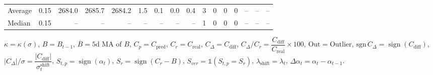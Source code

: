 \begin{threeparttable}
{\begin{tabular}{lrrrrrrrrrrrrrrr}
Average &     0.15 & 2684.0 & 2685.7 & 2684.2 &        1.5 &            0.1 &                      0.0 &                 0.4 &              3 &         0 &     0 &         0 &         -- &        -- &             -- \\
 Median &     0.15 &     -- &     -- &     -- &         -- &             -- &                       -- &                  -- &              1 &         0 &     0 &         0 &         -- &        -- &             -- \\
\bottomrule
\end{tabular}
}
\begin{tablenotes}\footnotesize
\item $\kappa=\kappa(\sigma)$, $B=B_{t-1}$, $\overline{B}=\text{5d MA of }B$, $C_p=C_{\text{pred}}$, $C_r=C_{\text{real}}$, $C_\Delta=C_{\text{diff}}$, $C_\Delta/C_r=\dfrac{C_{\text{diff}}}{C_{\text{real}}}\times100$, $\mathrm{Out}=\text{Outlier}$, $\mathrm{sgn}\,C_\Delta=\operatorname{sign}(C_{\text{diff}})$, $|C_\Delta|/\sigma=\dfrac{|C_{\text{diff}}|}{\sigma_t^{\text{shift}}}$, $S_{t,p}=\operatorname{sign}(\alpha_t)$, $S_r=\operatorname{sign}(C_r - B)$, $S_{ver}=\mathbb{1}(S_{t,p}=S_r)$, $\lambda_{\text{shift}}=\lambda_t$, $\Delta\alpha_t=\alpha_t-\alpha_{t-1}$.\end{tablenotes}
\end{threeparttable}
\endgroup

